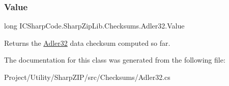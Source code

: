 \subsubsection{\texorpdfstring{Value}{Value}}
{\footnotesize\ttfamily long I\+C\+Sharp\+Code.\+Sharp\+Zip\+Lib.\+Checksums.\+Adler32.\+Value\hspace{0.3cm}{\ttfamily [get]}}



Returns the \hyperlink{class_i_c_sharp_code_1_1_sharp_zip_lib_1_1_checksums_1_1_adler32}{Adler32} data checksum computed so far. 



The documentation for this class was generated from the following file\+:\begin{DoxyCompactItemize}
\item 
Project/\+Utility/\+Sharp\+Z\+I\+P/src/\+Checksums/Adler32.\+cs\end{DoxyCompactItemize}
